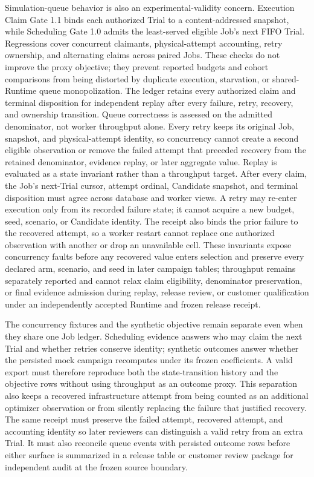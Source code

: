 Simulation-queue behavior is also an experimental-validity concern.
Execution Claim Gate 1.1 binds each authorized Trial to a
content-addressed snapshot, while Scheduling Gate 1.0 admits the
least-served eligible Job's next FIFO Trial. Regressions cover
concurrent claimants, physical-attempt accounting, retry ownership, and
alternating claims across paired Jobs. These checks do not improve the
proxy objective; they prevent reported budgets and cohort comparisons
from being distorted by duplicate execution, starvation, or
shared-Runtime queue monopolization. The ledger retains every authorized
claim and terminal disposition for independent replay after every
failure, retry, recovery, and ownership transition. Queue correctness is
assessed on the admitted denominator, not worker throughput alone. Every
retry keeps its original Job, snapshot, and physical-attempt identity, so
concurrency cannot create a second eligible observation or remove the
failed attempt that preceded recovery from the retained denominator,
evidence replay, or later aggregate value. Replay is evaluated as a state
invariant rather than a throughput target. After every claim, the Job's
next-Trial cursor, attempt ordinal, Candidate snapshot, and terminal
disposition must agree across database and worker views. A retry may
re-enter execution only from its recorded failure state; it cannot acquire
a new budget, seed, scenario, or Candidate identity. The receipt also
binds the prior failure to the recovered attempt, so a worker restart
cannot replace one authorized observation with another or drop an
unavailable cell. These invariants expose concurrency faults before any
recovered value enters selection and preserve every declared arm,
scenario, and seed in later campaign tables; throughput remains separately
reported and cannot relax claim eligibility, denominator preservation, or
final evidence admission during replay, release review, or customer
qualification under an independently accepted Runtime and frozen release
receipt.

The concurrency fixtures and the synthetic objective remain separate even
when they share one Job ledger. Scheduling evidence answers who may claim
the next Trial and whether retries conserve identity; synthetic outcomes
answer whether the persisted mock campaign recomputes under its frozen
coefficients. A valid export must therefore reproduce both the
state-transition history and the objective rows without using throughput
as an outcome proxy. This separation also keeps a recovered infrastructure
attempt from being counted as an additional optimizer observation or from
silently replacing the failure that justified recovery.
The same receipt must preserve the failed attempt, recovered attempt, and
accounting identity so later reviewers can distinguish a valid retry from
an extra Trial. It must also reconcile queue events with persisted outcome
rows before either surface is summarized in a release table or customer
review package for independent audit at the frozen source boundary.

